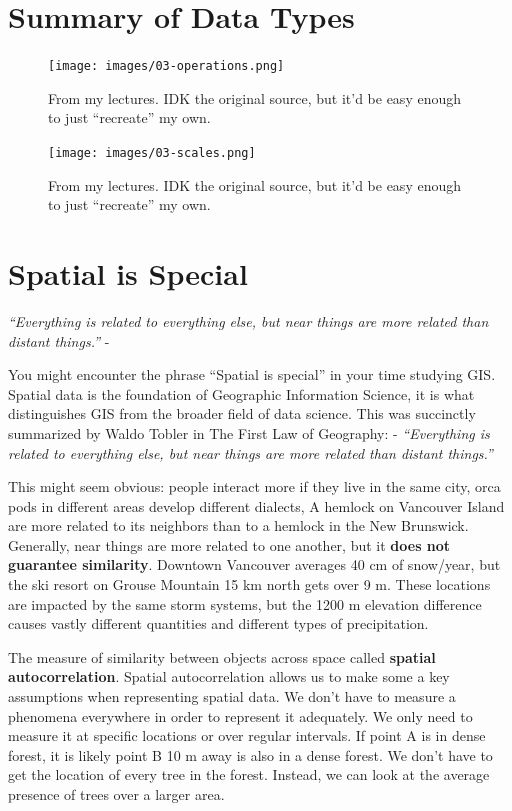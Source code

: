 \documentclass[
]{book}
\begin{document}
\hypertarget{summary-of-data-types}{%
\section{Summary of Data Types}\label{summary-of-data-types}}

\begin{figure}
\centering
\texttt{[image: images/03-operations.png]}
\caption{From my lectures. IDK the original source, but it'd be easy enough to just ``recreate'' my own.}
\end{figure}

\begin{figure}
\centering
\texttt{[image: images/03-scales.png]}
\caption{From my lectures. IDK the original source, but it'd be easy enough to just ``recreate'' my own.}
\end{figure}

\hypertarget{spatial-is-special}{%
\section{Spatial is Special}\label{spatial-is-special}}

\emph{``Everything is related to everything else, but near things are more related than distant things.''} -

You might encounter the phrase ``Spatial is special'' in your time studying GIS. Spatial data is the foundation of Geographic Information Science, it is what distinguishes GIS from the broader field of data science. This was succinctly summarized by Waldo Tobler in The First Law of Geography:
- \emph{``Everything is related to everything else, but near things are more related than distant things.''}

This might seem obvious: people interact more if they live in the same city, orca pods in different areas develop different dialects, A hemlock on Vancouver Island are more related to its neighbors than to a hemlock in the New Brunswick. Generally, near things are more related to one another, but it \textbf{does not guarantee similarity}. Downtown Vancouver averages 40 cm of snow/year, but the ski resort on Grouse Mountain 15 km north gets over 9 m. These locations are impacted by the same storm systems, but the 1200 m elevation difference causes vastly different quantities and different types of precipitation.

The measure of similarity between objects across space called \textbf{spatial autocorrelation}. Spatial autocorrelation allows us to make some a key assumptions when representing spatial data. We don't have to measure a phenomena everywhere in order to represent it adequately. We only need to measure it at specific locations or over regular intervals. If point A is in dense forest, it is likely point B 10 m away is also in a dense forest. We don't have to get the location of every tree in the forest. Instead, we can look at the average presence of trees over a larger area.
\end{document}
